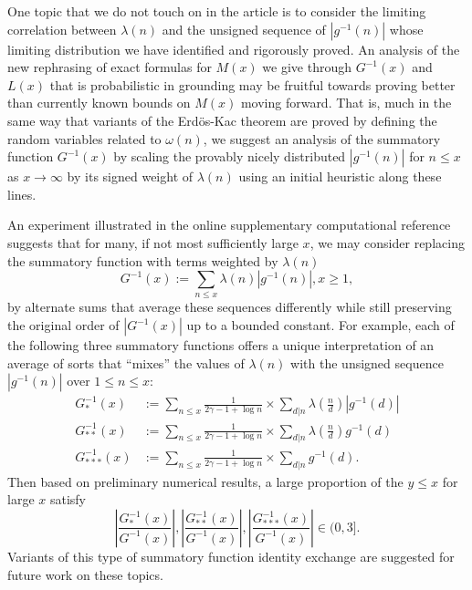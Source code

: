 \documentclass[11pt,reqno,a4letter]{article}
\numberwithin{figure}{section}
\numberwithin{table}{section}
\theoremstyle{plain}
\numberwithin{theorem}{section}
\theoremstyle{definition}
\begin{document}
One topic that we do not touch on in the article is to consider the limiting 
correlation between $\lambda(n)$ and the unsigned sequence of $|g^{-1}(n)|$ 
whose limiting distribution we have identified and rigorously proved. An 
analysis of the new rephrasing of exact formulas for $M(x)$ we give through 
$G^{-1}(x)$ and $L(x)$ that is probabilistic in grounding may be fruitful towards 
proving better than currently known bounds on $M(x)$ moving forward. 
That is, much in the same way that variants of the Erd\"{o}s-Kac theorem are proved 
by defining the random variables related to $\omega(n)$, 
we suggest an analysis of the summatory function $G^{-1}(x)$ by scaling 
the provably nicely distributed $|g^{-1}(n)|$ for $n \leq x$ as $x \rightarrow \infty$ by 
its signed weight of $\lambda(n)$ using an initial heuristic along these lines. 

An experiment illustrated in the online supplementary computational reference 
\cite{SCHMIDT-MERTENS-COMPUTATIONS} suggests that 
for many, if not most sufficiently large $x$, we may consider replacing the 
summatory function with terms weighted by $\lambda(n)$ 
\[
G^{-1}(x) := \sum_{n \leq x} \lambda(n) |g^{-1}(n)|, x \geq 1, 
\]
by alternate sums that average these sequences differently while still 
preserving the original order of $|G^{-1}(x)|$ up to a bounded constant. 
For example, each of the following three summatory functions offers a unique 
interpretation of an average of sorts that ``mixes'' the values of 
$\lambda(n)$ with the unsigned sequence $|g^{-1}(n)|$ over $1 \leq n \leq x$: 
\begin{align*}
G_{\ast}^{-1}(x) & := \sum_{n \leq x} \frac{1}{2\gamma-1+\log n} \times 
     \sum_{d|n} \lambda\left(\frac{n}{d}\right) |g^{-1}(d)| \\ 
G_{\ast\ast}^{-1}(x) & := \sum_{n \leq x} \frac{1}{2\gamma-1+\log n} \times 
     \sum_{d|n} \lambda\left(\frac{n}{d}\right) g^{-1}(d) \\ 
G_{\ast\ast\ast}^{-1}(x) & := \sum_{n \leq x} \frac{1}{2\gamma-1+\log n} \times 
     \sum_{d|n} g^{-1}(d). 
\end{align*}
Then based on preliminary numerical results, a large proportion of the $y \leq x$ for 
large $x$ satisfy 
\[
\left\lvert \frac{G_{\ast}^{-1}(x)}{G^{-1}(x)} \right\rvert, 
     \left\lvert \frac{G_{\ast\ast}^{-1}(x)}{G^{-1}(x)} \right\rvert, 
     \left\lvert \frac{G_{\ast\ast\ast}^{-1}(x)}{G^{-1}(x)} \right\rvert \in 
     (0, 3]. 
\]
Variants of this type of summatory function identity exchange are suggested for 
future work on these topics.
\end{document}
